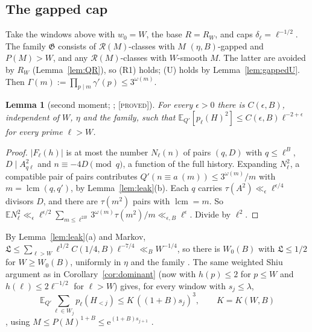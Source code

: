 \documentclass[10pt,reqno]{amsart}
\newtheorem{lemma}[theorem]{Lemma}
\theoremstyle{definition}
\theoremstyle{remark}
\newcommand{\cR}{\mathscr R}
\newcommand{\cG}{\mathfrak G}
\newcommand{\E}{\mathbb E}
\newcommand{\lcm}{\operatorname{lcm}}
\newcommand{\e}{\mathrm e}
\newcommand{\lab}[1]{\textup{[\textsc{#1}]}}
\begin{document}
\subsection{The gapped cap}
Take the windows above with $w_0=W$, the base $R=R_W$, and caps
$\delta_\ell=\ell^{-1/2}$.  The family $\cG$ consists of $\cR(M)$-classes
with $M$ $(\eta,B)$-gapped and $P(M)>W$, and any $\cR(M)$-classes with
$W$-smooth $M$.  The latter are avoided by $R_W$ (Lemma~\ref{lem:QR}), so
(R1) holds; (U) holds by Lemma~\ref{lem:gappedU}.  Then
$\Gamma(m):=\prod_{p\mid m}\gamma'(p)\leq3^{\omega(m)}$.

\begin{lemma}[second moment; {\cite[Lemma~2.4]{TW}}; \lab{proved}]\label{lem:secondmoment}
For every $\epsilon>0$ there is $C(\epsilon,B)$, independent of $W$, $\eta$
and the family, such that $\E_{Q'}[p_\ell(H)^2]\leq C(\epsilon,B)\ell^{-2+\epsilon}$
for every prime $\ell>W$.
\end{lemma}
\begin{proof}
$|F_\ell(h)|$ is at most the number $N_\ell(n)$ of pairs $(q,D)$ with
$q\leq\ell^B$, $D\mid A_{q\ell}^2$ and $n\equiv-4D\pmod q$, a function of the
full history.  Expanding $N_\ell^2$, a compatible pair of pairs contributes
$Q'(n\equiv a\ (m))\leq3^{\omega(m)}/m$ with $m=\lcm(q,q')$, by
Lemma~\ref{lem:leak}(b).  Each $q$ carries $\tau(A^2)\ll_\epsilon\ell^{\epsilon/4}$
divisors $D$, and there are $\tau(m^2)$ pairs with $\lcm=m$.  So
$\E N_\ell^2\ll_\epsilon\ell^{\epsilon/2}\sum_{m\leq\ell^{2B}}3^{\omega(m)}\tau(m^2)/m
\ll_{\epsilon,B}\ell^{\epsilon}$.  Divide by $\ell^2$.
\end{proof}

By Lemma~\ref{lem:leak}(a) and Markov,
$\mathfrak L\leq\sum_{\ell>W}\ell^{1/2}C(1/4,B)\ell^{-7/4}\ll_BW^{-1/4}$, so
there is $W_0(B)$ with $\mathfrak L\leq1/2$ for $W\geq W_0(B)$, uniformly in
$\eta$ and the family \cite[Cor.~2.5]{TW}.  The same weighted Shiu argument
as in Corollary~\ref{cor:dominant} (now with $h(p)\leq2$ for $p\leq W$ and
$h(\ell)\leq2\ell^{-1/2}$ for $\ell>W$) gives, for every window with
$s_j\leq\lambda$,
\begin{equation}\label{eq:windowmass}
 \E_{Q'}\sum_{\ell\in W_j}p_\ell(H_{<j})\leq K\,((1+B)s_j)^3,\qquad K=K(W,B)
\end{equation}
\cite[Lemma~2.6]{TW}, using $M\leq P(M)^{1+B}\leq\e^{(1+B)s_{j+1}}$
\cite[Lemma~2.4]{EB}.
\end{document}
